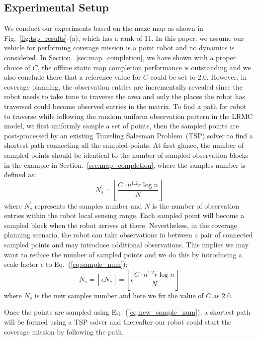 \subsection{Experimental Setup}
We conduct our experiments based on the maze map as shown in Fig.~\ref{fig:tsp_results}-(a), which has a rank of 11. In this paper, we assume our vehicle for performing coverage mission is a point robot and no dynamics is considered. In Section.~\ref{sec:map_completion}, we have shown with a proper choice of $C$, the offline static map completion performance is outstanding and we also conclude there that a reference value for $C$ could be set to 2.0. However, in coverage planning, the observation entries are incrementally revealed since the robot needs to take time to traverse the area and only the places the robot has traversed could become observed entries in the matrix. To find a path for robot to traverse while following the random uniform observation pattern in the LRMC model, we first uniformly sample a set of points, then the sampled points are post-processed by an existing Traveling Salesman Problem~(TSP) solver to find a shortest path connecting all the sampled points. At first glance, the number of sampled points should be identical to the number of sampled observation blocks in the example in Section.~\ref{sec:map_completion}, where the samples number is defined as:
\begin{equation}
    \label{eq:sample_num}
    N^{'}_{s} = \left \lfloor \frac{C\cdot n^{1.2}r\log n}{N} \right \rfloor
\end{equation}
where $N^{'}_{s}$ represents the samples number and $N$ is the number of observation entries within the robot local sensing range. Each sampled point will become a sampled block when the robot arrives at there. Nevertheless, in the coverage planning scenario, the robot can take observations in between a pair of connected sampled points and may introduce additional observations. This implies we may want to reduce the number of sampled points and we do this by introducing a scale factor $\epsilon$ to Eq.~(\ref{eq:sample_num}):
\begin{equation}
    \label{eq:new_sample_num}
    N_{s} = \left \lfloor \epsilon N^{'}_{s} \right \rfloor = \left \lfloor \epsilon \frac{C\cdot n^{1.2}r\log n}{N} \right \rfloor
\end{equation}
where $N_{s}$ is the new samples number and here we fix the value of $C$ as 2.0.

Once the points are sampled using Eq.~(\ref{eq:new_sample_num}), a shortest path will be formed using a TSP solver and thereafter our robot could start the coverage mission by following the path.

